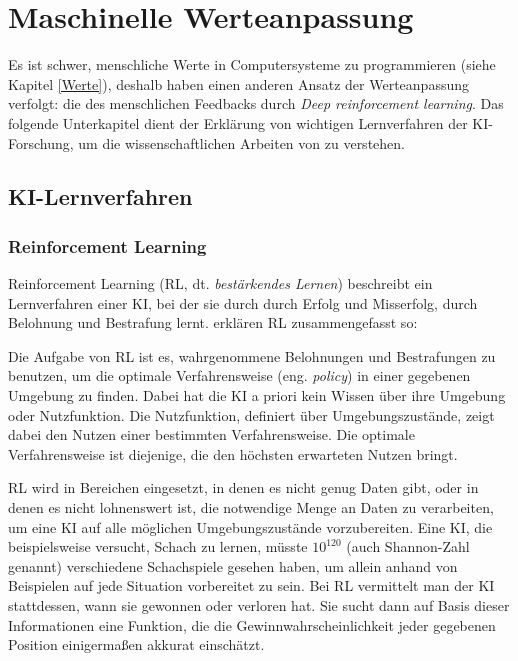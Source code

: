 \chapter{Maschinelle Werteanpassung}

Es ist schwer, menschliche Werte in Computersysteme zu programmieren (siehe Kapitel \ref{Werte}), deshalb haben \citeauthor{irving_ai_2018} einen anderen Ansatz der Werteanpassung verfolgt: die des menschlichen Feedbacks durch \emph{Deep reinforcement learning}. Das folgende Unterkapitel dient der Erklärung von wichtigen Lernverfahren der KI-Forschung, um die wissenschaftlichen Arbeiten von \citeauthor{irving_ai_2018} zu verstehen.

\section{KI-Lernverfahren}
\subsection{Reinforcement Learning}
Reinforcement Learning (RL, dt. \emph{bestärkendes Lernen}) beschreibt ein Lernverfahren einer KI, bei der sie durch durch Erfolg und Misserfolg, durch Belohnung und Bestrafung lernt. \citeauthor{russell_artificial_2016} erklären RL zusammengefasst so: 

Die Aufgabe von RL ist es, wahrgenommene Belohnungen und Bestrafungen zu benutzen, um die optimale Verfahrensweise (eng. \emph{policy}) in einer gegebenen Umgebung zu finden. Dabei hat die KI a priori kein Wissen über ihre Umgebung oder Nutzfunktion. Die Nutzfunktion, definiert über Umgebungszustände, zeigt dabei den Nutzen einer bestimmten Verfahrensweise. Die optimale Verfahrensweise ist diejenige, die den höchsten erwarteten Nutzen bringt.

RL wird in Bereichen eingesetzt, in denen es nicht genug Daten gibt, oder in denen es nicht lohnenswert ist, die notwendige Menge an Daten zu verarbeiten, um eine KI auf alle möglichen Umgebungszustände vorzubereiten. Eine KI, die beispielsweise versucht, Schach zu lernen, müsste $10^{120}$ (auch Shannon-Zahl genannt) verschiedene Schachspiele gesehen haben, um allein anhand von Beispielen auf jede Situation vorbereitet zu sein.  Bei RL vermittelt man der KI stattdessen, wann sie gewonnen oder verloren hat. Sie sucht dann auf Basis dieser Informationen eine Funktion, die die Gewinnwahrscheinlichkeit jeder gegebenen Position einigermaßen akkurat einschätzt.


